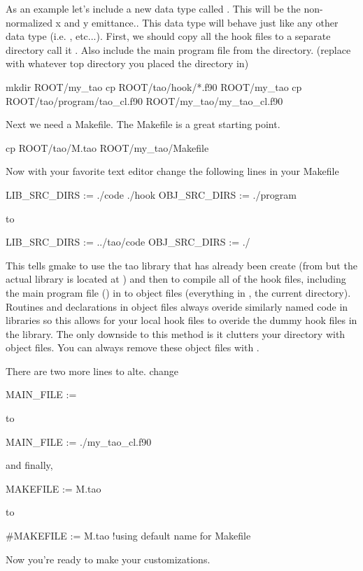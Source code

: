 As an example let's include a new data type called . This
will be the non-normalized x and y emittance.. This
data type will behave just like any other data type (i.e. , 
etc...). First, we should copy all the hook files to a separate directory call
it . Also include the main program file from the
 directory.
(replace  with whatever top directory you placed
the  directory in)
\begin{example}
  mkdir ROOT/my_tao
  cp ROOT/tao/hook/*.f90 ROOT/my_tao
  cp ROOT/tao/program/tao_cl.f90 ROOT/my_tao/my_tao_cl.f90
\end{example}
Next we need a Makefile. The  
Makefile is a great starting point.
\begin{example}
  cp ROOT/tao/M.tao ROOT/my_tao/Makefile
\end{example}
Now with your favorite text editor change the following lines in your Makefile
\begin{example}
  LIB\_SRC\_DIRS := ./code ./hook
  OBJ\_SRC\_DIRS := ./program
\end{example}
to
\begin{example}
  LIB\_SRC\_DIRS := ../tao/code
  OBJ\_SRC\_DIRS := ./
\end{example}
This tells gmake to use the tao library that has already been create (from 
 but the actual library is located at )
 and then to compile
all of the hook files, including the main program file () in
to object files (everything in , the current directory).
 Routines and declarations in object files always overide similarly named code in
libraries so this allows for your local hook files to overide the dummy hook
files in the \tao library. The only downside to this method is it clutters your
 directory with object files. You can always remove these object files
with .

There are two more lines to alte. change
\begin{example}
  MAIN\_FILE :=
\end{example}
to
\begin{example}
  MAIN\_FILE := ./my\_tao_cl.f90
\end{example}
and finally,
\begin{example}
  MAKEFILE := M.tao
\end{example}
to
\begin{example}
  #MAKEFILE := M.tao !using default name for Makefile
\end{example}
Now you're ready to make your customizations.

